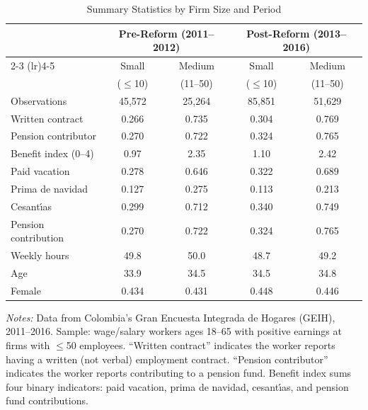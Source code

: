 \begin{table}[htbp]
\centering
\caption{Summary Statistics by Firm Size and Period}
\label{tab:summary}
\small
\begin{tabular}{lcccc}
\toprule
 & \multicolumn{2}{c}{Pre-Reform (2011--2012)} & \multicolumn{2}{c}{Post-Reform (2013--2016)} \\
\cmidrule(lr){2-3} \cmidrule(lr){4-5}
 & Small & Medium & Small & Medium \\
 & ($\leq$10) & (11--50) & ($\leq$10) & (11--50) \\
\midrule
Observations & 45,572 & 25,264 & 85,851 & 51,629 \\
Written contract & 0.266 & 0.735 & 0.304 & 0.769 \\
Pension contributor & 0.270 & 0.722 & 0.324 & 0.765 \\
Benefit index (0--4) & 0.97 & 2.35 & 1.10 & 2.42 \\
Paid vacation & 0.278 & 0.646 & 0.322 & 0.689 \\
Prima de navidad & 0.127 & 0.275 & 0.113 & 0.213 \\
Cesant\'{\i}as & 0.299 & 0.712 & 0.340 & 0.749 \\
Pension contribution & 0.270 & 0.722 & 0.324 & 0.765 \\
Weekly hours & 49.8 & 50.0 & 48.7 & 49.2 \\
Age & 33.9 & 34.5 & 34.5 & 34.8 \\
Female & 0.434 & 0.431 & 0.448 & 0.446 \\
\bottomrule
\end{tabular}
\begin{tablenotes}
\item \textit{Notes:} Data from Colombia's Gran Encuesta Integrada de Hogares (GEIH), 2011--2016. Sample: wage/salary workers ages 18--65 with positive earnings at firms with $\leq$50 employees. ``Written contract'' indicates the worker reports having a written (not verbal) employment contract. ``Pension contributor'' indicates the worker reports contributing to a pension fund. Benefit index sums four binary indicators: paid vacation, prima de navidad, cesant\'{\i}as, and pension fund contributions.
\end{tablenotes}
\end{table}
